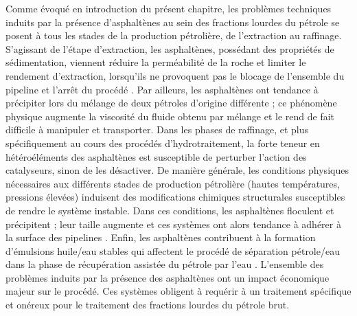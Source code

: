 	Comme évoqué en introduction du présent chapitre, les problèmes techniques induits par la présence d'asphaltènes au sein des fractions lourdes du pétrole se posent à tous les stades de la production pétrolière, de l'extraction au raffinage. 
	S'agissant de l'étape d'extraction, les asphaltènes, possédant des propriétés de sédimentation, viennent réduire la perméabilité de la roche et limiter le rendement d'extraction, lorsqu'ils ne provoquent pas le blocage de l'ensemble du pipeline et l'arrêt du procédé \cite{huang2011fundamental}. Par ailleurs, les asphaltènes ont tendance à précipiter lors du mélange de deux pétroles d'origine différente ; ce phénomène physique augmente la viscosité du fluide obtenu par mélange et le rend de fait difficile à manipuler et transporter. 
	Dans les phases de raffinage, et plus spécifiquement au cours des procédés d'hydrotraitement, la forte teneur en hétéroéléments des asphaltènes est susceptible de perturber l'action des catalyseurs, sinon de les désactiver. 
	De manière générale, les conditions physiques nécessaires aux différents stades de production pétrolière (hautes températures, pressions élevées) induisent des modifications chimiques structurales susceptibles de rendre le système instable. Dans ces conditions, les asphaltènes floculent et précipitent ; leur taille augmente et ces systèmes ont alors tendance à adhérer à la surface des pipelines \cite{broseta2000detection}. Enfin, les asphaltènes contribuent à la formation d'émulsions huile/eau stables qui affectent le procédé de séparation pétrole/eau dans la phase de récupération assistée du pétrole par l'eau \cite{kokal1999quantification}.  
	L'ensemble des problèmes induits par la présence des asphaltènes ont un impact économique majeur sur le procédé. Ces systèmes obligent à requérir à un traitement spécifique et onéreux pour le traitement des fractions lourdes du pétrole brut. 
	
	


